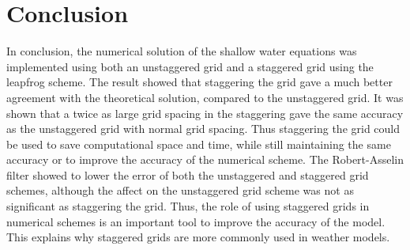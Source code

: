 \newpage\section{Conclusion}

In conclusion, the numerical solution of the shallow water equations was implemented using both an unstaggered grid and a staggered grid using the leapfrog scheme. The result showed that staggering the grid gave a much better agreement with the theoretical solution, compared to the unstaggered grid. It was shown that a twice as large grid spacing in the staggering gave the same accuracy as the unstaggered grid with normal grid spacing. Thus staggering the grid could be used to save computational space and time, while still maintaining the same accuracy or to improve the accuracy of the numerical scheme. The Robert-Asselin filter showed to lower the error of both the unstaggered and staggered grid schemes,  although the affect on the unstaggered grid scheme was not as significant as staggering the grid. Thus, the role of using staggered grids in numerical schemes is an important tool to improve the accuracy of the model. This explains why staggered grids are more commonly used in weather models. 